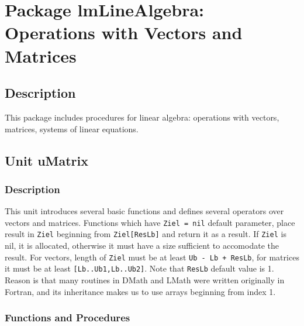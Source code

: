 \documentclass[12pt,a4paper,oneside]{report}
\newcommand{\lmatha}[1]{   %
	\marginpar{\vspace{#1} 
		\begin{flushright}
			LMath 0.5
	\end{flushright} }
}
\newcommand{\code}[1]{\texttt{#1}}
\begin{document}
\chapter[Package lmLineAlgebra]{Package lmLineAlgebra: Operations with Vectors and Matrices}\label{package-lmLineAlgebra}
\section{Description}
This package includes procedures for linear algebra: operations with vectors, matrices, systems of linear equations.
\section{Unit uMatrix}\label{sec:unit-umatrix}
\lmatha{-28pt}
\label{umatrix} 
\subsection{Description}
This unit introduces several basic functions  and defines several operators over vectors and matrices.  Functions which have \code{Ziel = nil} default parameter, place result in \code{Ziel} beginning from \code{Ziel[ResLb]} and return it as a result. If \code{Ziel} is nil, it is allocated, otherwise it must have a size sufficient to accomodate the result. For vectors, length of \code{Ziel} must be at least \code{Ub - Lb + ResLb}, for matrices it must be at least \code{[Lb..Ub1,Lb..Ub2]}. Note that \code{ResLb} default value is 1. Reason is that many routines in DMath and LMath were written originally in Fortran, and its inheritance makes us to use arrays beginning from index 1. 
\subsection{Functions and Procedures}
\end{document}
